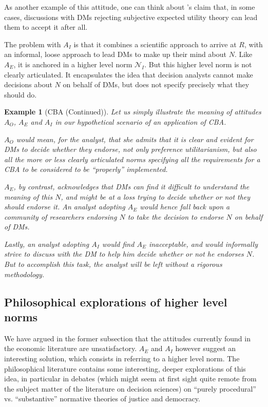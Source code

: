 \documentclass[preprint, french, english, 11pt, authoryear]{elsarticle}%
\newtheorem{example}{Example}
\begin{document}
As another example of this attitude, one can think about \citet{raiffa_back_1985}’s claim that, in some cases, discussions with \acp{DM} rejecting subjective expected utility theory can lead them to accept it after all.

The problem with $A_I$ is that it combines a scientific approach to arrive at $R$, with an informal, loose approach to lead \acp{DM} to make up their mind about $N$.
Like $A_E$, it is anchored in a higher level norm $\mathscr{N}_I$. But this higher level norm is not clearly articulated. It encapsulates the idea that decision analysts cannot make decisions about $N$ on behalf of \acp{DM}, but does not specify precisely what they should do.

\begin{example}[CBA (Continued)]
Let us simply illustrate the meaning of attitudes $A_O$, $A_E$ and $A_I$ in our hypothetical scenario of an application of CBA.

$A_O$ would mean, for the analyst, that she admits that it is clear and evident for \acp{DM} to decide whether they endorse, not only preference utilitarianism, but also all the more or less clearly articulated norms specifying all the requirements for a CBA to be considered to be ``properly'' implemented.

$A_E$, by contrast, acknowledges that \acp{DM} can find it difficult to understand the meaning of this $N$, and might be at a loss trying to decide whether or not they should endorse it. An analyst adopting $A_E$ would hence fall back upon a community of researchers endorsing $N$ to take the decision to endorse $N$ on behalf of \acp{DM}.

Lastly, an analyst adopting $A_I$ would find $A_E$ inacceptable, and would informally strive to discuss with the \ac{DM} to help him decide whether or not he endorses $N$. But to accomplish this task, the analyst will be left without a rigorous methodology.
\end{example}

\subsection{Philosophical explorations of higher level norms}
\label{sec:higher}
We have argued in the former subsection that the attitudes currently found in the economic literature are unsatisfactory. $A_E$ and $A_I$ however suggest an interesting solution, which consists in referring to a higher level norm. The philosophical literature contains some interesting, deeper explorations of this idea, in particular in debates (which might seem at first sight quite remote from the subject matter of the literature on decision sciences) on “purely procedural” vs. “substantive” normative theories of justice and democracy.
\end{document}
